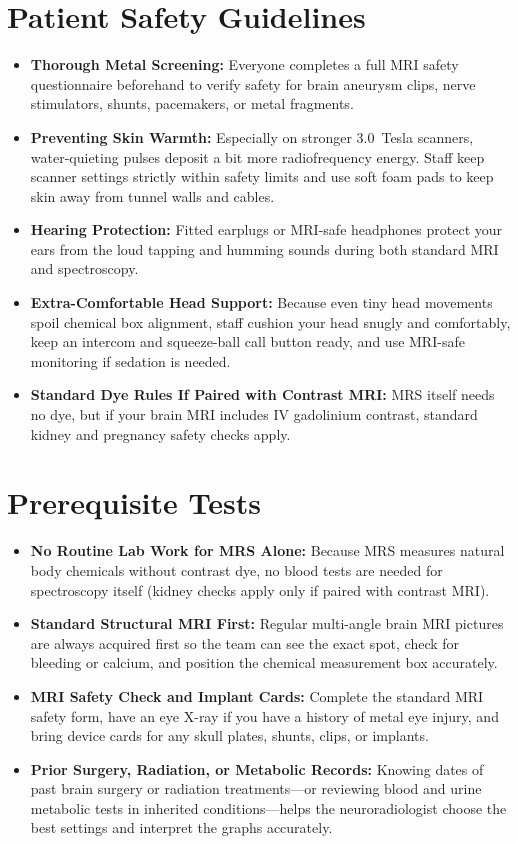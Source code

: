 \section{Patient Safety Guidelines}
\begin{itemize}
\item \textbf{Thorough Metal Screening:} Everyone completes a full MRI safety questionnaire beforehand to verify safety for brain aneurysm clips, nerve stimulators, shunts, pacemakers, or metal fragments.
\item \textbf{Preventing Skin Warmth:} Especially on stronger 3.0~Tesla scanners, water-quieting pulses deposit a bit more radiofrequency energy. Staff keep scanner settings strictly within safety limits and use soft foam pads to keep skin away from tunnel walls and cables.
\item \textbf{Hearing Protection:} Fitted earplugs or MRI-safe headphones protect your ears from the loud tapping and humming sounds during both standard MRI and spectroscopy.
\item \textbf{Extra-Comfortable Head Support:} Because even tiny head movements spoil chemical box alignment, staff cushion your head snugly and comfortably, keep an intercom and squeeze-ball call button ready, and use MRI-safe monitoring if sedation is needed.
\item \textbf{Standard Dye Rules If Paired with Contrast MRI:} MRS itself needs no dye, but if your brain MRI includes IV gadolinium contrast, standard kidney and pregnancy safety checks apply.
\end{itemize}

\section{Prerequisite Tests}
\begin{itemize}
\item \textbf{No Routine Lab Work for MRS Alone:} Because MRS measures natural body chemicals without contrast dye, no blood tests are needed for spectroscopy itself (kidney checks apply only if paired with contrast MRI).
\item \textbf{Standard Structural MRI First:} Regular multi-angle brain MRI pictures are always acquired first so the team can see the exact spot, check for bleeding or calcium, and position the chemical measurement box accurately.
\item \textbf{MRI Safety Check and Implant Cards:} Complete the standard MRI safety form, have an eye X-ray if you have a history of metal eye injury, and bring device cards for any skull plates, shunts, clips, or implants.
\item \textbf{Prior Surgery, Radiation, or Metabolic Records:} Knowing dates of past brain surgery or radiation treatments---or reviewing blood and urine metabolic tests in inherited conditions---helps the neuroradiologist choose the best settings and interpret the graphs accurately.
\end{itemize}


